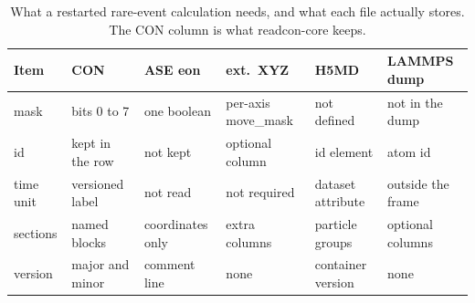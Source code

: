 \begin{table}[ht]
\centering
\small
\caption{What a restarted rare-event calculation needs, and what each file actually stores. The CON column is what readcon-core keeps.}
\label{tab:compat}
\footnotesize
\setlength{\tabcolsep}{3pt}
\begin{tabularx}{\linewidth}{@{}>{\raggedright\arraybackslash}p{1.45cm}>{\raggedright\arraybackslash}X>{\raggedright\arraybackslash}X>{\raggedright\arraybackslash}X>{\raggedright\arraybackslash}X>{\raggedright\arraybackslash}X@{}}
\toprule
Item & CON & ASE eon & ext.\ XYZ & H5MD & LAMMPS dump \\
\midrule
mask & bits 0 to 7 & one boolean & per-axis move\_mask & not defined & not in the dump \\
id & kept in the row & not kept & optional column & id element & atom id \\
time unit & versioned label & not read & not required & dataset attribute & outside the frame \\
sections & named blocks & coordinates only & extra columns & particle groups & optional columns \\
version & major and minor & comment line & none & container version & none \\
\bottomrule
\end{tabularx}
\end{table}
